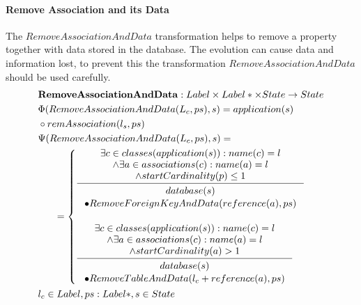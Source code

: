 \documentclass[11pt]{article}
\begin{document}
\paragraph{Remove Association and its Data} The $RemoveAssociationAndData$ transformation helps to remove a property together with data stored in the database. The evolution can cause data and information lost, to prevent this the transformation $RemoveAssociationAndData $ should be used carefully.
\begin{align*}
&	\mathbf{RemoveAssociationAndData} : Label \times Label* \times State \rightarrow State \\
&	\Phi(RemoveAssociationAndData(L_c, ps), s) = application(s)\\ 
& \circ remAssociation(l_s, ps) \\
&	\Psi(RemoveAssociationAndData(L_c, ps), s) = \\
& \;\;\;\;\;\; = \begin{cases}
 		\inference{\exists c \in classes(application(s)) : name(c) = l\\ 	\wedge \exists a \in associations(c) : name(a) = l \\ \wedge startCardinality(p) \leq 1}{\begin{gathered}
	database(s) \\ \bullet RemoveForeignKeyAndData(reference(a), ps)
\end{gathered}}
 		\\\\
 	\inference{\exists c \in classes(application(s)) : name(c) = l\\ 	\wedge \exists a \in associations(c) : name(a) = l \\ \wedge startCardinality(a) > 1}{\begin{gathered}
	database(s) \\\bullet RemoveTableAndData(l_c + reference(a), ps)
\end{gathered}}
 \end{cases}
	\\
&	l_c \in Label, ps : Label*, s \in State
\end{align*}
\end{document}
